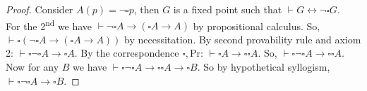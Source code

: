 \documentclass[a4paper,10pt]{article}
\theoremstyle{definition}
\newcommand{\proves}{\vdash}
\begin{document}
\begin{proof}
    Consider $A(p) = \neg \square p$, then $G$ is a fixed point such that $\proves G \leftrightarrow \neg \square G$.\\
    For the 2\textsuperscript{nd} we have $\proves \neg \square A \rightarrow (\square A \rightarrow A)$ by propositional calculus. So, $\proves \square (\neg \square A \rightarrow (\square A \rightarrow A))$ by necessitation. By second provability rule and axiom 2:  $\proves \square \neg \square A \rightarrow \square A$.
    By the correspondence $\square, \mathrm{Pr}$: $\proves \square A \rightarrow \square \square A$. So, $\proves \square \neg \square A \rightarrow \square \square A$. Now for any $B$ we have $\proves \square \neg \square A \rightarrow \square \square A \rightarrow \square B$. So by hypothetical syllogism, $\proves \square \neg \square A \rightarrow \square B$.
\end{proof}
\end{document}
